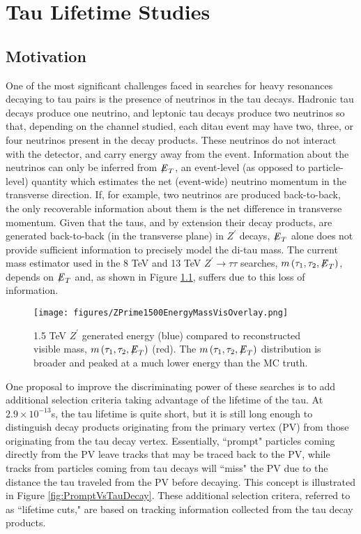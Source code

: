 \chapter{Tau Lifetime Studies}

\section{Motivation}

One of the most significant challenges faced in searches for heavy resonances decaying to tau pairs is the presence of neutrinos in the tau decays. Hadronic tau decays produce one neutrino, and leptonic tau decays produce two neutrinos so that, depending on the channel studied, each ditau event may have two, three, or four neutrinos present in the decay products. These neutrinos do not interact with the detector, and carry energy away from the event. Information about the neutrinos can only be inferred from ${\not\mathrel{E}}_T$, an event-level (as opposed to particle-level) quantity which estimates the net (event-wide) neutrino momentum in the transverse direction. If, for example, two neutrinos are produced back-to-back, the only recoverable information about them is the net difference in transverse momentum. Given that the taus, and by extension their decay products, are generated back-to-back (in the transverse plane) in $Z^\prime$ decays, ${\not\mathrel{E}}_T$ alone does not provide sufficient information to precisely model the di-tau mass. The current mass estimator used in the 8 TeV and 13 TeV $Z^\prime\to\tau\tau$ searches, $m\left(\tau_1, \tau_2, {\not\mathrel{E}}_T\right)$, depends on ${\not\mathrel{E}}_T$ and, as shown in Figure \ref{fig:massVisSigVsMC}, suffers due to this loss of information.

\begin{figure}[tbh!]
\centering
\texttt{[image: figures/ZPrime1500EnergyMassVisOverlay.png]}
\caption{1.5 TeV $Z^\prime$ generated energy (blue) compared to reconstructed visible mass, $m\left(\tau_1, \tau_2, {\not\mathrel{E}}_T\right)$ (red). The $m\left(\tau_1, \tau_2, {\not\mathrel{E}}_T\right)$ distribution is broader and peaked at a much lower energy than the MC truth.}
\label{fig:massVisSigVsMC}
\end{figure}

One proposal to improve the discriminating power of these searches is to add additional selection criteria taking advantage of the lifetime of the tau. At $2.9\times 10^{-13}$s, the tau lifetime is quite short, but it is still long enough to distinguish decay products originating from the primary vertex (PV) from those originating from the tau decay vertex. Essentially, ``prompt" particles coming directly from the PV leave tracks that may be traced back to the PV, while tracks from particles coming from tau decays will ``miss" the PV due to the distance the tau traveled from the PV before decaying. This concept is illustrated in Figure \ref{fig:PromptVsTauDecay}. These additional selection critera, referred to as ``lifetime cuts," are based on tracking information collected from the tau decay products.

